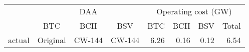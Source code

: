 
\begin{tabular}[t]{lcccrrrr}
\toprule
\multicolumn{1}{c}{ } & \multicolumn{3}{c}{DAA} & \multicolumn{4}{c}{Operating cost (GW)} \\
\cmidrule(l{3pt}r{3pt}){2-4} \cmidrule(l{3pt}r{3pt}){5-8}
 & BTC & BCH & BSV & BTC & BCH & BSV & Total\\
\midrule
actual & Original & CW-144 & CW-144 & 6.26 & 0.16 & 0.12 & 6.54\\
\bottomrule
\end{tabular}
